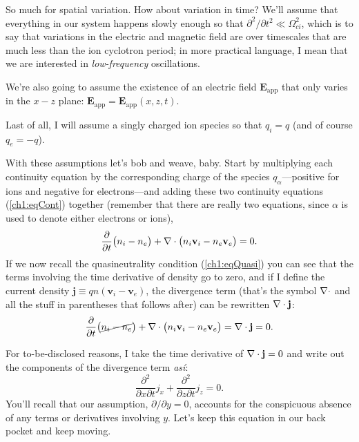 So much for spatial variation. How about variation in time? We'll assume that
everything in our system happens slowly enough so that $\partial^2 / \partial
t^2 \ll \Omega_{ci}^2$, which is to say that variations in the electric and
magnetic field are over timescales that are much less than the ion cyclotron
period; in more practical language, I mean that we are interested in
\emph{low-frequency} oscillations. 

We're also going to assume the existence of an electric field
$\mathbf{E}_{\textrm{app}}$ that only varies in the $x-z$ plane:
$\mathbf{E}_{\textrm{app}} = \mathbf{E}_{\textrm{app}} (x, z, t)$.

Last of all, I will assume a singly charged ion species so that $q_i = q$ (and
of course $q_e = -q$).

With these assumptions let's bob and weave, baby. Start by multiplying each
continuity equation by the corresponding charge of the species
$q_\alpha$---positive for ions and negative for electrons---and adding these two
continuity equations (\ref{ch1:eqCont}) together (remember that there are really
two equations, since $\alpha$ is used to denote either electrons or ions),
\begin{equation} \label{ch1:eqCont1} \dfrac{\partial}{\partial t} \big (
  n_i - n_e \big ) + {\bf \nabla} \cdot \big (n_i \mathbf{v}_i - n_{e}
  \mathbf{v}_{e} \big ) = 0.
\end{equation}
If we now recall the quasineutrality condition (\ref{ch1:eqQuasi}) you can see
that the terms involving the time derivative of density go to zero, and if I
define the current density $\mathbf{j} \equiv q n ( \mathbf{v}_i - \mathbf{v}_e
)$, the divergence term (that's the symbol ${\bf \nabla} \cdot$ and all the stuff in
parentheses that follows after) can be rewritten ${\bf \nabla} \cdot \mathbf{j}$:
\begin{equation} \label{ch1:eqCont1} \dfrac{\partial}{\partial t} \big (
  \cancel{n_i - n_e} \big ) + {\bf \nabla} \cdot \big (n_i \mathbf{v}_i - n_{e}
  \mathbf{v}_{e} \big ) = {\bf \nabla} \cdot \mathbf{j} = 0.
\end{equation}


For to-be-disclosed reasons, I take the time derivative of ${\bf \nabla} \cdot
\mathbf{j} = 0$ and write out the components of the divergence term
\emph{as\'{i}}:
\begin{equation} \label{ch1:eqCont2} \dfrac{\partial^2}{\partial x \partial t}
  j_x + \dfrac{\partial^2}{\partial z \partial t} j_z = 0.
\end{equation}
You'll recall that our assumption, $\partial / \partial y = 0$, accounts for the
conspicuous absence of any terms or derivatives involving $y$. Let's keep this
equation in our back pocket and keep moving.

